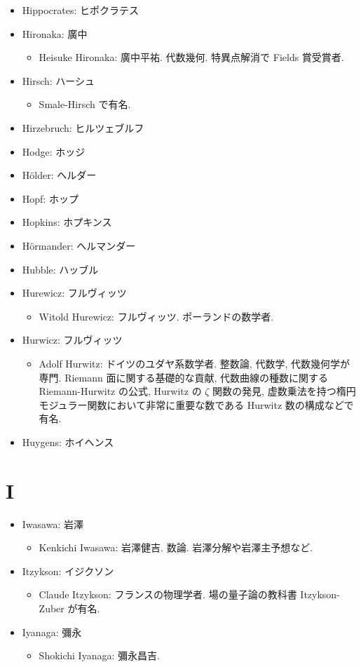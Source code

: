 \documentclass[openany, a4paper, oneside]{jsbook}
\begin{document}
\begin{itemize}
\item Hippocrates: ヒポクラテス
\item Hironaka: 廣中
\begin{itemize}
\item Heisuke Hironaka: 廣中平祐. 代数幾何. 特異点解消で Fields 賞受賞者.
\end{itemize}
\item Hirsch: ハーシュ
\begin{itemize}
\item Smale-Hirsch で有名.
\end{itemize}
\item Hirzebruch: ヒルツェブルフ
\item Hodge: ホッジ
\item H\"older: ヘルダー
\item Hopf: ホップ
\item Hopkins: ホプキンス
\item H\"ormander: ヘルマンダー
\item Hubble: ハッブル
\item Hurewicz: フルヴィッツ
\begin{itemize}
\item Witold Hurewicz: フルヴィッツ. ポーランドの数学者.
\end{itemize}
\item Hurwicz: フルヴィッツ
\begin{itemize}
\item Adolf Hurwitz: ドイツのユダヤ系数学者. 整数論, 代数学, 代数幾何学が専門. Riemann 面に関する基礎的な貢献, 代数曲線の種数に関する Riemann-Hurwitz の公式, Hurwitz の $\zeta$ 関数の発見, 虚数乗法を持つ楕円モジュラー関数において非常に重要な数である Hurwitz 数の構成などで有名.
\end{itemize}
\item Huygens: ホイヘンス
\end{itemize}
\section{I}

\begin{itemize}
\item Iwasawa: 岩澤
\begin{itemize}
\item Kenkichi Iwasawa: 岩澤健吉. 数論. 岩澤分解や岩澤主予想など.
\end{itemize}
\item Itzykson: イジクソン
\begin{itemize}
\item Claude Itzykson: フランスの物理学者. 場の量子論の教科書 Itzykson-Zuber が有名.
\end{itemize}
\item Iyanaga: 彌永
\begin{itemize}
\item Shokichi Iyanaga: 彌永昌吉.
\end{itemize}
\end{itemize}
\end{document}
